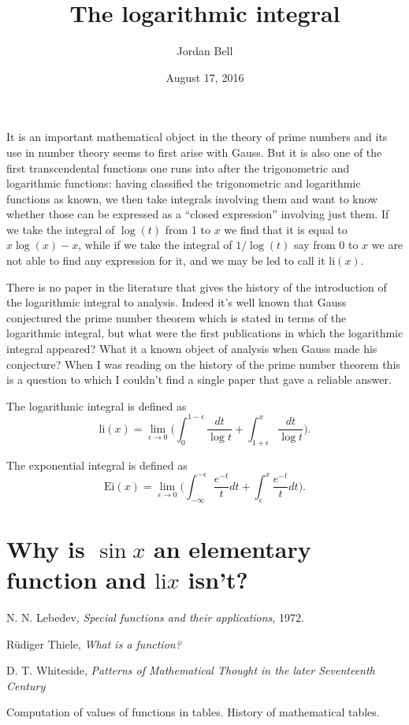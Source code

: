 \documentclass{article}
\newcommand{\li}{\mathrm{li}}
\newcommand{\Ei}{\mathrm{Ei}}
\begin{document}
\title{The logarithmic integral}
\author{Jordan Bell}
\date{August 17, 2016}
\maketitle

It is an important mathematical object in the theory of
prime numbers and its use in number theory seems to first arise with Gauss.
But it is also
one of the first transcendental functions one runs into after the
trigonometric and logarithmic functions: having classified the
trigonometric and logarithmic functions as known, we then take
integrals involving them and want to know whether those can be
expressed as a ``closed expression'' involving just them. If we take the
integral of $\log(t)$ from 1 to $x$ we find that it is equal to
$x\log(x)-x$,
while if we take the integral of $1/\log(t)$ say from 0 to $x$ we are not
able to find any expression for it, and we may be led to call it
$\li(x)$.

There is no paper in the literature that gives the history of the introduction
of the logarithmic integral to analysis. Indeed it's well known that Gauss
conjectured the prime number theorem which is stated in terms of the logarithmic
integral, but what were the first publications in which the logarithmic integral
appeared? What it a known object of analysis when Gauss made his conjecture?
When I was reading on the history of the prime number theorem this is a
question to which I couldn't find a single paper that gave a reliable answer.


The logarithmic integral is defined as
\[
\li(x)=\lim_{\epsilon \to 0} \Big( \int_0^{1-\epsilon} \frac{dt}{\log t}
+\int_{1+\epsilon}^x \frac{dt}{\log t}\Big).
\]

The exponential integral is defined as
\[
\Ei(x)=\lim_{\epsilon \to 0} \Big( \int_{-\infty}^{-\epsilon}
\frac{e^{-t}}{t} dt + \int_{\epsilon}^x \frac{e^{-t}}{t} dt\Big).
\]

\section{Why is $\sin x$ an elementary function and $\li x$ isn't?}
N. N. Lebedev, {\em Special functions and their applications}, 1972.

R\"udiger Thiele, {\em What is a function?}

D. T. Whiteside, {\em Patterns of Mathematical Thought 
in the later Seventeenth Century}

Computation of values of functions in tables. History of mathematical tables.
\end{document}
